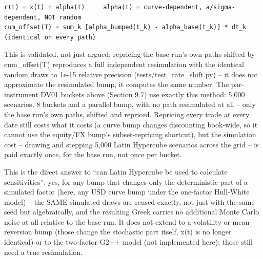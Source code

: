 \documentclass[11pt,letterpaper]{article}
\begin{document}
{\fontsize{7.2}{8.8}\selectfont
\begin{verbatim}
r(t) = x(t) + alpha(t)     alpha(t) = curve-dependent, a/sigma-dependent, NOT random
cum_offset(T) = sum_k [alpha_bumped(t_k) - alpha_base(t_k)] * dt_k     (identical on every path)
\end{verbatim}}
This is validated, not just argued: repricing the base run's own paths shifted by cum\_offset(T) reproduces a full independent resimulation with the identical random draws to 1e-15 relative precision (tests/test\_rate\_shift.py) -- it does not approximate the resimulated bump, it computes the same number. The par-instrument DV01 buckets above (Section 9.7) use exactly this method: 5,000 scenarios, 8 buckets and a parallel bump, with no path resimulated at all -- only the base run's own paths, shifted and repriced. Repricing every trade at every date still costs what it costs (a curve bump changes discounting book-wide, so it cannot use the equity/FX bump's subset-repricing shortcut), but the simulation cost -- drawing and stepping 5,000 Latin Hypercube scenarios across the grid -- is paid exactly once, for the base run, not once per bucket.

This is the direct answer to ``can Latin Hypercube be used to calculate sensitivities'': yes, for any bump that changes only the deterministic part of a simulated factor (here, any USD curve bump under the one-factor Hull-White model) -- the SAME simulated draws are reused exactly, not just with the same seed but algebraically, and the resulting Greek carries no additional Monte Carlo noise at all relative to the base run. It does not extend to a volatility or mean-reversion bump (those change the stochastic part itself, x(t) is no longer identical) or to the two-factor G2++ model (not implemented here); those still need a true resimulation.
\end{document}
